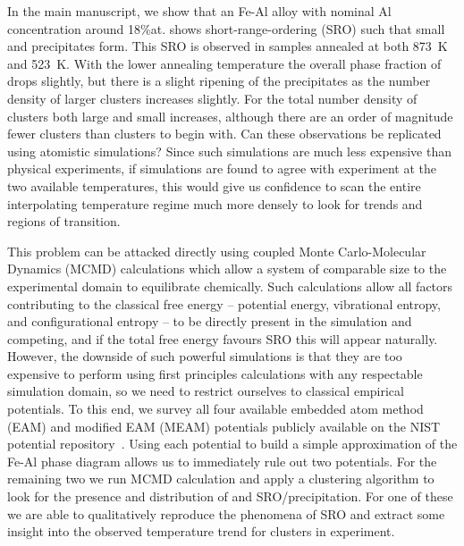 In the main manuscript, we show that an Fe-Al alloy with nominal Al concentration around 18\%at. shows short-range-ordering (SRO) such that small \DOTHREE and \BTWO precipitates form.
This SRO is observed in samples annealed at both 873~K and 523~K.
With the lower annealing temperature the overall phase fraction of \DOTHREE drops slightly, but there is a slight ripening of the precipitates as the number density of larger clusters increases slightly.
For \BTWO the total number density of clusters both large and small increases, although there are an order of magnitude fewer \BTWO clusters than \DOTHREE clusters to begin with.
Can these observations be replicated using atomistic simulations?
Since such simulations are much less expensive than physical experiments, if simulations are found to agree with experiment at the two available temperatures, this would give us confidence to scan the entire interpolating temperature regime much more densely to look for trends and regions of transition.

This problem can be attacked directly using coupled Monte Carlo-Molecular Dynamics (MCMD) calculations which allow a system of comparable size to the experimental domain to equilibrate chemically.
Such calculations allow all factors contributing to the classical free energy -- potential energy, vibrational entropy, and configurational entropy -- to be directly present in the simulation and competing, and if the total free energy favours SRO this will appear naturally.
However, the downside of such powerful simulations is that they are too expensive to perform using first principles calculations with any respectable simulation domain, so we need to restrict ourselves to classical empirical potentials.
To this end, we survey all four available embedded atom method (EAM) and modified EAM (MEAM) potentials publicly available on the NIST potential repository~\cite{nist}.
Using each potential to build a simple approximation of the Fe-Al phase diagram allows us to immediately rule out two potentials.
For the remaining two we run MCMD calculation and apply a clustering algorithm to look for the presence and distribution of \DOTHREE and \BTWO SRO/precipitation.
For one of these we are able to qualitatively reproduce the phenomena of SRO and extract some insight into the observed temperature trend for \DOTHREE clusters in experiment.
